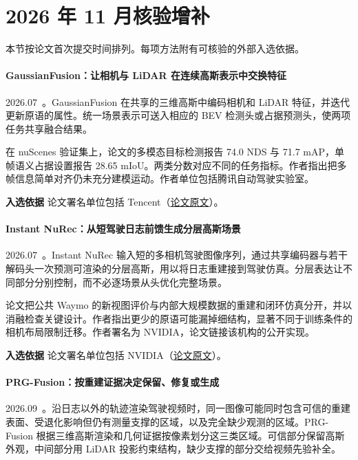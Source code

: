 \section{2026 年 11 月核验增补}

本节按论文首次提交时间排列。每项方法附有可核验的外部入选依据。

\paragraph{GaussianFusion：让相机与 LiDAR 在连续高斯表示中交换特征}
2026.07~\cite{2607_00746}。GaussianFusion 在共享的三维高斯中编码相机和 LiDAR 特征，并迭代更新原语的属性。统一场景表示可送入相应的 BEV 检测头或占据预测头，使两项任务共享融合结果。

在 nuScenes 验证集上，论文的多模态目标检测报告 74.0 NDS 与 71.7 mAP，单帧语义占据设置报告 28.65 mIoU。两类分数对应不同的任务指标。作者指出把多帧信息简单对齐仍未充分建模运动。作者单位包括腾讯自动驾驶实验室。

\textbf{入选依据} 论文署名单位包括 Tencent（\href{https://arxiv.org/html/2607.00746v1}{论文原文}）。

\paragraph{Instant NuRec：从短驾驶日志前馈生成分层高斯场景}
2026.07~\cite{2607_14203}。Instant NuRec 输入短的多相机驾驶图像序列，通过共享编码器与若干解码头一次预测可渲染的分层高斯，用以将日志重建接到驾驶仿真。分层表达让不同部分分别控制，而不必逐场景从头优化完整场景。

论文把公共 Waymo 的新视图评价与内部大规模数据的重建和闭环仿真分开，并以消融检查关键设计。作者指出更少的原语可能漏掉细结构，显著不同于训练条件的相机布局限制迁移。作者署名为 NVIDIA，论文链接该机构的公开实现。

\textbf{入选依据} 论文署名单位包括 NVIDIA（\href{https://arxiv.org/html/2607.14203v2}{论文原文}）。

\paragraph{PRG-Fusion：按重建证据决定保留、修复或生成}
2026.09~\cite{2609_06948}。沿日志以外的轨迹渲染驾驶视频时，同一图像可能同时包含可信的重建表面、受退化影响但仍有测量支撑的区域，以及完全缺少观测的区域。PRG-Fusion 根据三维高斯渲染和几何证据按像素划分这三类区域。可信部分保留高斯外观，中间部分用 LiDAR 投影约束结构，缺少支撑的部分交给视频先验补全。

